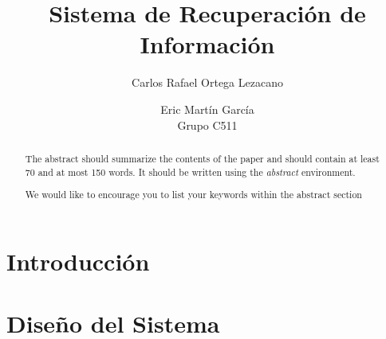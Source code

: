 \documentclass[runningheads,a4paper]{llncs}
\newcommand{\keywords}[1]{\par\addvspace\baselineskip
\noindent\keywordname\enspace\ignorespaces#1}
\begin{document}
\mainmatter  %

\title{Sistema de Recuperación de Información}


%
%
\author{Carlos Rafael Ortega Lezacano \and Eric Martín García \\ Grupo C511}
%


%
%

\maketitle


\begin{abstract}
The abstract should summarize the contents of the paper and should
contain at least 70 and at most 150 words. It should be written using the
\emph{abstract} environment.
\keywords{We would like to encourage you to list your keywords within
the abstract section}
\end{abstract}


\section{Introducción}

\section{Diseño del Sistema}
\end{document}
